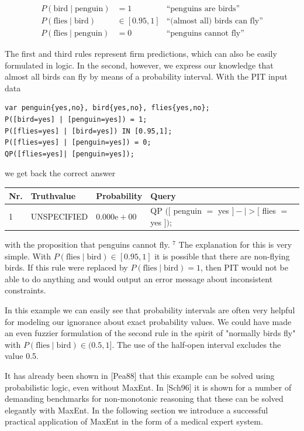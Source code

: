 \documentclass[10pt]{book}
\begin{document}
\[
\begin{array}{lll}
P(\text{bird} \mid \text{penguin}) &= 1 & \text{``penguins are birds''} \\
P(\text{flies} \mid \text{bird}) &\in [0.95,1] & \text{``(almost all) birds can fly''} \\
P(\text{flies} \mid \text{penguin}) &= 0 & \text{``penguins cannot fly''}
\end{array}
\]

The first and third rules represent firm predictions, which can also be easily formulated in logic. In the second, however, we express our knowledge that almost all birds can fly by means of a probability interval. With the PIT input data

\begin{verbatim}
var penguin{yes,no}, bird{yes,no}, flies{yes,no};
P([bird=yes] | [penguin=yes]) = 1;
P([flies=yes] | [bird=yes]) IN [0.95,1];
P([flies=yes] | [penguin=yes]) = 0;
QP([flies=yes]| [penguin=yes]);
\end{verbatim}

we get back the correct answer

\begin{center}
\begin{tabular}{llll}
\hline
Nr. & Truthvalue & Probability & Query \\
\hline
1 & UNSPECIFIED & $0.000 \mathrm{e}+00$ & QP $([$ penguin $=$ yes $]-\mid>[$ flies $=$ yes $]) ;$ \\
\hline
\end{tabular}
\end{center}

with the proposition that penguins cannot fly. ${ }^{7}$ The explanation for this is very simple. With $P(\text{flies} \mid \text{bird}) \in[0.95,1]$ it is possible that there are non-flying birds. If this rule were replaced by $P(\text{flies} \mid \text{bird})=1$, then PIT would not be able to do anything and would output an error message about inconsistent constraints.

In this example we can easily see that probability intervals are often very helpful for modeling our ignorance about exact probability values. We could have made an even fuzzier formulation of the second rule in the spirit of "normally birds fly" with $P(\text{flies} \mid \text{bird}) \in(0.5,1]$. The use of the half-open interval excludes the value 0.5.

It has already been shown in [Pea88] that this example can be solved using probabilistic logic, even without MaxEnt. In [Sch96] it is shown for a number of demanding benchmarks for non-monotonic reasoning that these can be solved elegantly with MaxEnt. In the following section we introduce a successful practical application of MaxEnt in the form of a medical expert system.
\end{document}

